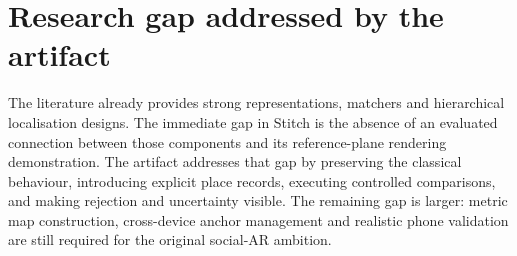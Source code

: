 \section{Research gap addressed by the artifact}
The literature already provides strong representations, matchers and hierarchical localisation designs. The immediate gap in Stitch is the absence of an evaluated connection between those components and its reference-plane rendering demonstration. The artifact addresses that gap by preserving the classical behaviour, introducing explicit place records, executing controlled comparisons, and making rejection and uncertainty visible. The remaining gap is larger: metric map construction, cross-device anchor management and realistic phone validation are still required for the original social-AR ambition.

